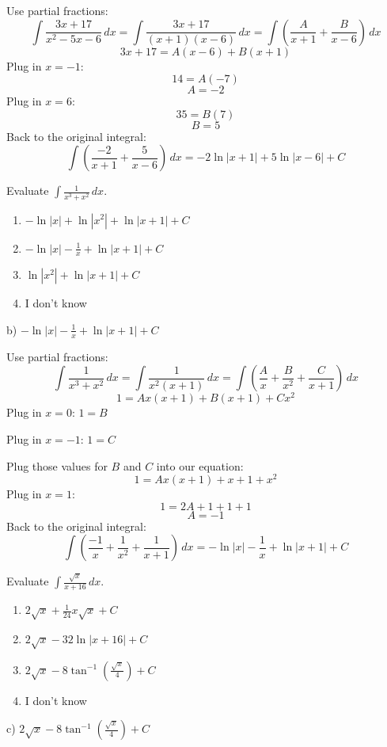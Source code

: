 \documentclass[addpoints,12pt,answers]{exam}
\begin{document}
\begin{questions}
\begin{solution}
    Use partial fractions:
    $$\int\frac{3x+17}{x^2-5x-6}\,dx=\int\frac{3x+17}{(x+1)(x-6)}\,dx=\int\left(\frac{A}{x+1}+\frac{B}{x-6}\right)\,dx$$
    $$3x+17=A(x-6)+B(x+1)$$
    Plug in $x=-1$:
    $$14=A(-7)$$
    $$A=-2$$    
    Plug in $x=6$:
    $$35=B(7)$$
    $$B=5$$
    Back to the original integral:
    $$\int\left(\frac{-2}{x+1}+\frac{5}{x-6}\right)\,dx=-2\ln|x+1|+5\ln|x-6|+C$$
  \end{solution}
  \newpage
  \question
  Evaluate $\displaystyle\int\frac{1}{x^3+x^2}\,dx$.
  \begin{enumerate}[label=\alph*)]
    \item
    $-\ln|x|+\ln|x^2|+\ln|x+1|+C$
    \item
    $\displaystyle -\ln|x|-\frac{1}{x}+\ln|x+1|+C$
    \item
    $\ln|x^2|+\ln|x+1|+C$
    \item
    I don't know
  \end{enumerate}
  \begin{solution}
    b) $\displaystyle -\ln|x|-\frac{1}{x}+\ln|x+1|+C$
    
    Use partial fractions:
    $$\int\frac{1}{x^3+x^2}\,dx=\int\frac{1}{x^2(x+1)}\,dx=\int\left(\frac{A}{x}+\frac{B}{x^2}+\frac{C}{x+1}\right)\,dx$$
    $$1=Ax(x+1)+B(x+1)+Cx^2$$
    Plug in $x=0$: $1=B$
    
    Plug in $x=-1$: $1=C$
    
    Plug those values for $B$ and $C$ into our equation:
    $$1=Ax(x+1)+x+1+x^2$$
    Plug in $x=1$:
    $$1=2A+1+1+1$$
    $$A=-1$$
    Back to the original integral:
    $$\int\left(\frac{-1}{x}+\frac{1}{x^2}+\frac{1}{x+1}\right)\,dx=-\ln|x|-\frac{1}{x}+\ln|x+1|+C$$
  \end{solution}
  \newpage
  \question
  Evaluate $\displaystyle\int\frac{\sqrt{x}}{x+16}\,dx$.
  \begin{enumerate}[label=\alph*)]
    \item
    $\displaystyle 2\sqrt{x}+\frac{1}{24}x\sqrt{x}+C$
    \item
    $\displaystyle 2\sqrt{x}-32\ln|x+16|+C$
    \item
    $\displaystyle 2\sqrt{x}-8\tan^{-1}\left(\frac{\sqrt{x}}{4}\right)+C$
    \item
    I don't know
  \end{enumerate}
  \begin{solution}
    c) $\displaystyle 2\sqrt{x}-8\tan^{-1}\left(\frac{\sqrt{x}}{4}\right)+C$
    

\end{solution}
\end{questions}
\end{document}
